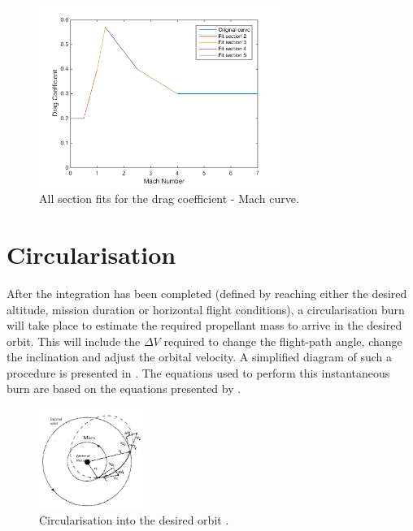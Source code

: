 \begin{figure}[H]
\centering
\includegraphics[width=0.7\textwidth]{figures/software/dragCoeffFit.png}
\caption{All section fits for the drag coefficient - Mach curve.}
\label{fig:dragCoeffFit}
\end{figure}


\section{Circularisation}
\label{sec:modelCircularisation}
After the integration has been completed (defined by reaching either the desired altitude, mission duration or horizontal flight conditions), a circularisation burn will take place to estimate the required propellant mass to arrive in the desired orbit. This will include the $\Delta V$ required to change the flight-path angle, change the inclination and adjust the orbital velocity. A simplified diagram of such a procedure is presented in . The equations used to perform this instantaneous burn are based on the equations presented by \cite{wakker2010}.



\begin{figure}[H]
\centering
\includegraphics[width=0.3\textwidth]{figures/circularisation/deltaVcircularOrbitMars_wakker2010.png}
\caption{Circularisation into the desired orbit \citep{wakker2010}.}
\label{fig:deltaVcircularOrbitMars_wakker2010}
\end{figure}

